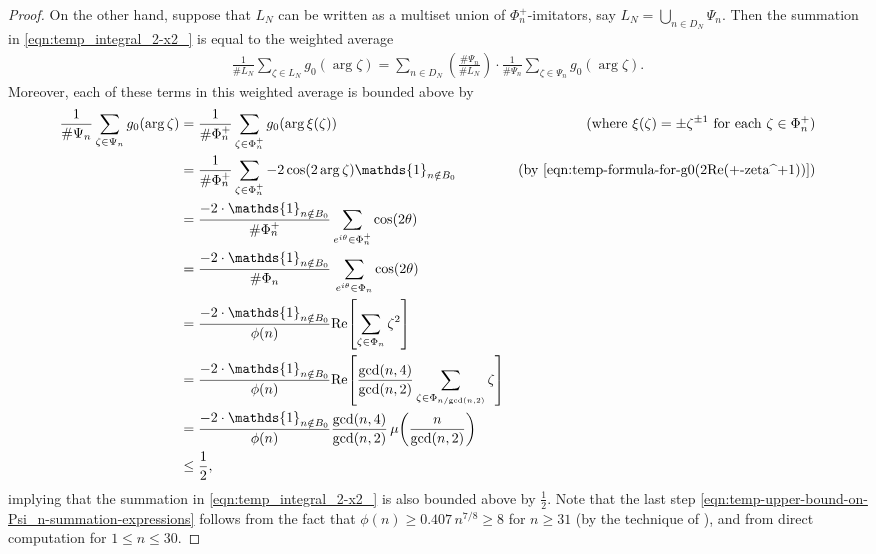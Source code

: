 \documentclass[11pt,letterpaper,reqno]{amsart}
\theoremstyle{definition}
\numberwithin{equation}{section}
\numberwithin{figure}{section}
\numberwithin{table}{section}
\newcommand{\lrp}[1]{\!\left(#1\right)}
\newcommand{\lrb}[1]{\!\left[#1\right]}
\begin{document}
\begin{proof}
    On the other hand, suppose that $L_N$ can be written as a multiset union of $\Phi_n^+$-imitators, say
    $
        L_N = \bigcup_{n \in D_N}  \Psi_n
    $. 
    Then the summation in \eqref{eqn:temp_integral_2-x2_} is equal to the weighted average
    \begin{align}
        \frac{1}{\# L_N} \sum_{\zeta \in L_N} g_0(\arg \zeta) 
        =
        \sum_{n \in D_N} \lrp{\frac{\# \Psi_n}{\# L_N}} \cdot 
        \frac{1}{\# \Psi_n}  \sum_{\zeta \in \Psi_n}  g_0\lrp{\arg\zeta}.
    \end{align}
    Moreover, each of these terms in this weighted average is bounded above by 
    \begin{align}
        \frac{1}{\# \Psi_n}  \sum_{\zeta \in \Psi_n}  g_0\lrp{\arg \zeta} 
        &=
        \frac{1}{\# \Phi_n^+}  \sum_{\zeta \in \Phi_n^+}  g_0\lrp{\arg \xi(\zeta)} 
        & \hspace{-25mm}\text{(where $\xi(\zeta) = \pm \zeta^{\pm 1}$ for each $\zeta \in \Phi_n^+$)}
        \\
        &=
        \frac{1}{\# \Phi_n^+} \sum_{\zeta \in \Phi_n^+} 
        -2 \cos(2 \arg \zeta)
        \mathds{1}_{n \notin B_0} 
        & \text{(by \eqref{eqn:temp-formula-for-g0(2Re(+-zeta^+1))})}
        \\
        &=
        \frac{-2 \cdot \mathds{1}_{n \notin B_0}}{\# \Phi_n^+}
        \sum_{e^{i\theta} \in \Phi_n^+} \cos(2\theta) 
        \\
        &= 
        \frac{-2 \cdot \mathds{1}_{n \notin B_0}}{\# \Phi_n} \,\sum_{e^{i\theta} \in \Phi_n} \cos(2\theta)
        \\
        &= \frac{-2 \cdot \mathds{1}_{n \notin B_0}}{\phi(n)} \mathrm{Re}\lrb{\sum_{\zeta \in \Phi_n} \zeta^2 }  \\
        &= \frac{-2 \cdot \mathds{1}_{n \notin B_0}}{\phi(n)}  \mathrm{Re}\lrb{
            \frac{\gcd(n,4)}{\gcd(n,2)} \sum_{\zeta \in \Phi_{n/\!\gcd(n,2)}} \zeta
        } \\
        &= \frac{-2 \cdot \mathds{1}_{n \notin B_0}}{\phi(n)} \frac{\gcd(n,4)}{\gcd(n,2)}
            \,\mu\lrp{\frac{n}{\gcd(n,2)}} \\
        &\le \frac{1}{2}, \label{eqn:temp-upper-bound-on-Psi_n-summation-expressions} 
    \end{align}
    implying that the summation in \eqref{eqn:temp_integral_2-x2_} is also bounded above by $\frac{1}{2}$. Note that the last step \eqref{eqn:temp-upper-bound-on-Psi_n-summation-expressions} follows from the fact that
    $\phi(n) \ge 0.407\, n^{7/8} \ge 8$ for $n \ge 31$ (by the technique of \cite{ross-explicit-bounds}), and from direct computation for $1 \le n \le 30$.


\end{proof}
\end{document}
